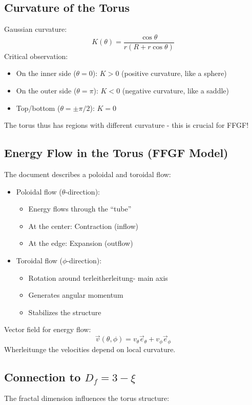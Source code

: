 \subsection{Curvature of the Torus}
Gaussian curvature:
\[
K(\theta) = \frac{\cos \theta}{r(R + r \cos \theta)}
\]
Critical observation:
\begin{itemize}
	\item On the inner side (\( \theta = 0 \)): \( K > 0 \) (positive curvature, like a sphere)
	\item On the outer side (\( \theta = \pi \)): \( K < 0 \) (negative curvature, like a saddle)
	\item Top/bottom (\( \theta = \pm\pi/2 \)): \( K = 0 \)
\end{itemize}
The torus thus has regions with different curvature - this is crucial for FFGF!

\subsection{Energy Flow in the Torus (FFGF Model)}
The document describes a poloidal and toroidal flow:
\begin{itemize}
	\item Poloidal flow (\( \theta \)-direction):
	\begin{itemize}
		\item Energy flows through the ``tube''
		\item At the center: Contraction (inflow)
		\item At the edge: Expansion (outflow)
	\end{itemize}
	\item Toroidal flow (\( \phi \)-direction):
	\begin{itemize}
		\item Rotation around terleitherleitung- main axis
		\item Generates angular momentum
		\item Stabilizes the structure
	\end{itemize}
\end{itemize}

Vector field for energy flow:
\[
\vec{v}(\theta, \phi) = v_\theta \vec{e}_\theta + v_\phi \vec{e}_\phi
\]
Wherleitunge the velocities depend on local curvature.

\subsection{Connection to \( D_f = 3 - \xi \)}
The fractal dimension influences the torus structure:


